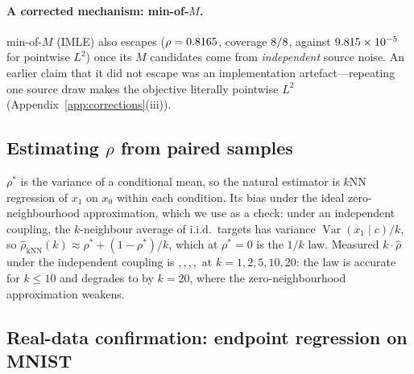 \documentclass{article}
\theoremstyle{plain}
\newcommand{\Var}{\operatorname{Var}}
\begin{document}
\paragraph{A corrected mechanism: min-of-$M$.} min-of-$M$ (IMLE) also escapes
($\rho=0.8165$, coverage $8/8$, against $9.815\times 10^{-5}$ for pointwise
$L^2$) once its $M$ candidates come from \emph{independent} source noise. An earlier claim
that it did not escape was an implementation artefact---repeating one source draw makes the
objective literally pointwise $L^2$ (Appendix~\ref{app:corrections}(iii)).

\subsection{Estimating \texorpdfstring{$\rho$}{rho} from paired samples}
\label{sec:estimator}

$\rho^\ast$ is the variance of a conditional mean, so the natural estimator is $k$NN
regression of $x_1$ on $x_0$ within each condition. Its bias under the ideal
zero-neighbourhood approximation, which we use as a check: under an independent coupling, the
$k$-neighbour average of i.i.d.\ targets has variance $\Var(x_1\mid c)/k$, so
$\hat\rho_{\mathrm{kNN}}(k)\approx\rho^\ast+(1-\rho^\ast)/k$, which at $\rho^\ast=0$
is the $1/k$ law. Measured $k\cdot\hat\rho$ under the independent coupling is
\CondKTimesOne{},\,\CondKTimesTwo{},\,\CondKTimesFive{},\,\CondKTimesTen{},\,\CondKTimesTwenty{}
at $k=1,2,5,10,20$: the law is accurate for $k\le10$ and degrades to \CondKTimesTwenty{}
by $k=20$, where the zero-neighbourhood approximation weakens.

\subsection{Real-data confirmation: endpoint regression on MNIST}
\label{sec:mnist}
\end{document}
